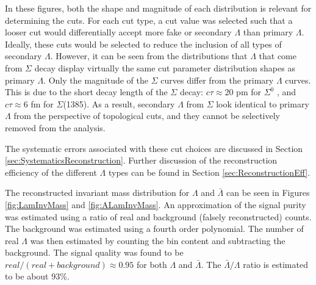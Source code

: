 In these figures, both the shape and magnitude of each distribution is relevant for determining the cuts. 
For each cut type, a cut value was selected such that a looser cut would differentially accept more fake or secondary $\Lambda$ than primary $\Lambda$. 
Ideally, these cuts would be selected to reduce the inclusion of all types of secondary $\Lambda$.  
However, it can be seen from the distributions that $\Lambda$ that come from $\Sigma$ decay display virtually the same cut parameter distribution shapes as primary $\Lambda$.  
Only the magnitude of the $\Sigma$ curves differ from the primary $\Lambda$ curves.  
This is due to the short decay length of the $\Sigma$ decay: $c\tau \approx 20$ pm for $\Sigma^0$ , and $c\tau \approx 6$ fm for $\Sigma$(1385). 
As a result, secondary $\Lambda$ from $\Sigma$ look identical to primary $\Lambda$ from the perspective of topological cuts, and they cannot be selectively removed from the analysis.

The systematic errors associated with these cut choices are discussed in Section \ref{sec:SystematicsReconstruction}. 
Further discussion of the reconstruction efficiency of the different $\Lambda$ types can be found in Section \ref{sec:ReconstructionEff}.

The reconstructed invariant mass distribution for $\Lambda$ and $\bar{\Lambda}$ can be seen in Figures \ref{fig:LamInvMass} and \ref{fig:ALamInvMass}. 
An approximation of the signal purity was estimated using a ratio of real and background (falsely reconstructed) counts.  
The background was estimated using a fourth order polynomial.  
The number of real $\Lambda$ was then estimated by counting the bin content and subtracting the background. 
The signal quality was found to be $real/(real + background) \approx 0.95$ for both $\Lambda$ and $\bar{\Lambda}$.
The $\bar{\Lambda}/\Lambda$ ratio is estimated to be about 93\%.

